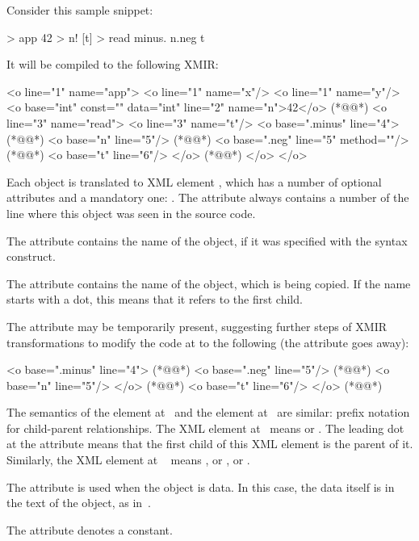 Consider this sample \eolang{} snippet:

\begin{ffcode}
[x y] > app
  42 > n!
  [t] > read
    minus.
      n.neg
      t
\end{ffcode}

It will be compiled to the following XMIR:

\begin{ffcode}
<o line="1" name="app">
  <o line="1" name="x"/>
  <o line="1" name="y"/>
  <o base="int" const="" data="int"
    line="2" name="n">42</o>   (*@\label{ln:xml-data}@*)
  <o line="3" name="read">
    <o line="3" name="t"/>
    <o base=".minus" line="4"> (*@\label{ln:xml-minus}@*)
      <o base="n" line="5"/> (*@\label{ln:method-start}@*)
      <o base=".neg" line="5" method=""/>  (*@\label{ln:method-end}@*)
      <o base="t" line="6"/>
    </o> (*@\label{ln:xml-minus-end}@*)
  </o>
</o>
\end{ffcode}

Each object is translated to XML element , which has
a number of optional attributes and a mandatory one: .
The attribute  always contains a number of the
line where this object was seen in the source code.

The attribute  contains the name of the object, if
it was specified with the \ff{>} syntax construct.

The attribute  contains the name of the object, which
is being copied. If the name starts with a dot, this means
that it refers to the first  child.

The attribute  may be temporarily present, suggesting
further steps of XMIR transformations to modify the code
at  to the following (the attribute 
goes away):

\begin{ffcode}
<o base=".minus" line="4"> (*@\label{ln:new-minus}@*)
  <o base=".neg" line="5"/> (*@\label{ln:xml-neg}@*)
    <o base="n" line="5"/>
  </o> (*@\label{ln:xml-neg-end}@*)
  <o base="t" line="6"/>
</o> (*@\label{ln:new-minus-end}@*)
\end{ffcode}

The semantics of the element  at~
and the element  at~ are similar: prefix
notation for child-parent relationships. The XML element at~
means  or . The
leading dot at the attribute  means that the first
child of this XML element is the \eolang{} parent of it.
Similarly, the XML element at ~
means , or , or .

The attribute  is used when the object is data. In this
case, the data itself is in the text of the object, as in~.

The attribute  denotes a constant.

